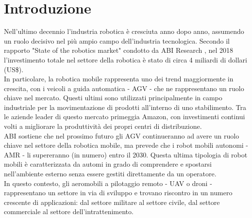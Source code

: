 
\chapter{Introduzione}\label{ch:intro}
Nell'ultimo decennio l'industria robotica è cresciuta anno dopo anno, assumendo un ruolo decisivo nel più ampio campo dell'industria tecnologica. Secondo il rapporto "State of the robotics market" condotto da ABI Research \cite{ABI}, nel 2018 l'investimento totale nel settore della robotica è stato di circa 4 miliardi di dollari (US\$).\\

In particolare, la robotica mobile rappresenta uno dei trend maggiormente in crescita, con i veicoli a guida automatica - \ac{AGV} - che ne rappresentano un ruolo chiave nel mercato. Questi ultimi sono utilizzati principalmente in campo industriale per la movimentazione di prodotti all'interno di uno stabilimento. Tra le aziende leader di questo mercato primeggia Amazon, con investimenti continui volti a migliorare la produttività dei propri centri di distribuzione.\\

ABI sostiene che nel prossimo futuro gli \acs{AGV} continueranno ad avere un ruolo chiave nel settore della robotica mobile, ma prevede che i robot mobili autonomi - \ac{AMR} - li supereranno (in numero) entro il 2030. Questa ultima tipologia di robot mobili è caratterizzata da automi in grado di comprendere e spostarsi nell'ambiente esterno senza essere gestiti direttamente da un operatore.\\

In questo contesto, gli aeromobili a pilotaggio remoto - \ac{UAV} o droni - rappresentano un settore in via di sviluppo e trovano riscontro in un numero crescente di applicazioni: dal settore militare al settore civile, dal settore commerciale al settore dell'intrattenimento.


\pagebreak

